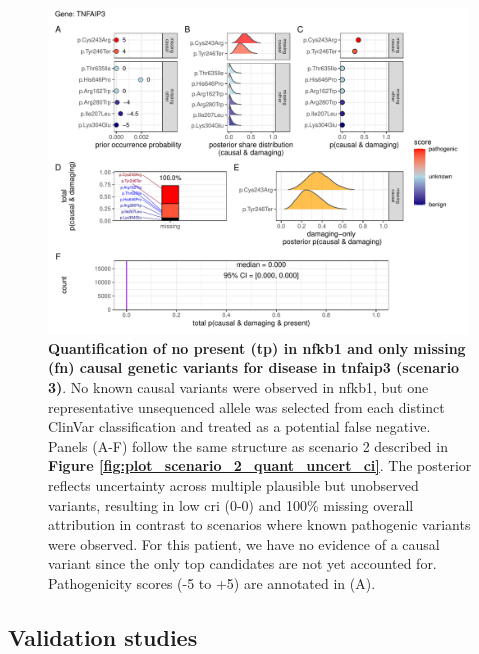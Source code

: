 \begin{figure}[h]
  \centering
  \includegraphics[width=0.99\textwidth]{../images/plot_scenario_3_quant_uncert_ci.pdf}
  \caption{
 \textbf{Quantification of no present (\ac{tp}) in \ac{nfkb1} and only missing (\ac{fn}) causal genetic variants for disease in \ac{tnfaip3} (scenario 3)}.
No known causal variants were observed in \ac{nfkb1}, but one representative unsequenced allele was selected from each distinct ClinVar classification and treated as a potential false negative.  
Panels (A-F) follow the same structure as scenario 2 described in \textbf{Figure \ref{fig:plot_scenario_2_quant_uncert_ci}}.  
The posterior reflects uncertainty across multiple plausible but unobserved variants, resulting in low \ac{cri} (0-0) and 100\% missing overall attribution in contrast to scenarios where known pathogenic variants were observed. For this patient, we have no evidence of a causal variant since the only top candidates are not yet accounted for.
Pathogenicity scores (-5 to +5) are annotated in (A).
  }
  \label{fig:plot_scenario_3_quant_uncert_ci}
\end{figure}

\clearpage











\subsection{Validation studies}
